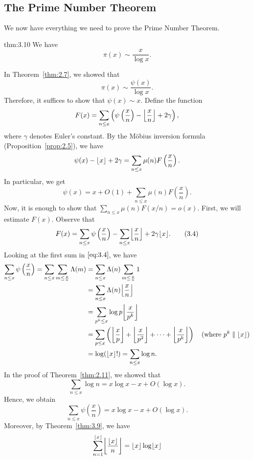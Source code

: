 \subsection{The Prime Number Theorem}\label{subsec:3.5}
We now have everything we need to prove the Prime Number Theorem. 

\begin{theo}{thm:3.10}
    We have 
    \[ \pi(x) \sim \frac{x}{\log x}. \] 
\end{theo}
\begin{pf}
    In Theorem~\ref{thm:2.7}, we showed that 
    \[ \pi(x) \sim \frac{\psi(x)}{\log x}. \] 
    Therefore, it suffices to show that $\psi(x) \sim x$. Define the function 
    \[ F(x) = \sum_{n\leq x} \left( \psi\left( \frac xn \right) - \floor*{\frac xn}
    + 2\gamma \right), \] 
    where $\gamma$ denotes Euler's constant. By the M\"obius inversion formula 
    (Proposition~\ref{prop:2.5}), we have 
    \[ \psi(x) - \floor{x} + 2\gamma = \sum_{n\leq x} \mu(n) F\left( \frac xn \right). \] 
    In particular, we get 
    \[ \psi(x) = x + O(1) + \sum_{n \leq x} \mu(n) F\left( \frac xn \right). \] 
    Now, it is enough to show that $\sum_{n\leq x} \mu(n) F(x/n) = o(x)$. First, 
    we will estimate $F(x)$. Observe that 
    \[ F(x) = \sum_{n\leq x} \psi\left( \frac xn \right) - \sum_{n \leq x} 
    \floor*{\frac xn} + 2\gamma\floor{x}. \tag{3.4}\label{eq:3.4} \]
    Looking at the first sum in $\eqref{eq:3.4}$, we have 
    \begin{align*}
        \sum_{n\leq x} \psi\left( \frac xn \right) 
        = \sum_{n \leq x} \sum_{m \leq \frac xn} \Lambda(m) 
        &= \sum_{n \leq x} \Lambda(n) \sum_{m\leq \frac xn} 1 \\
        &= \sum_{n \leq x} \Lambda(n) \floor*{\frac xn} \\
        &= \sum_{p^k \leq x} \log p \floor*{\frac x{p^k}} \\ 
        &= \sum_{p \leq x} \left( \floor*{\frac xp} + \floor*{\frac x{p^2}} 
        + \cdots + \floor*{\frac x{p^k}} \right) \quad \text{(where $p^k\;\|\;\floor{x}$)} \\
        &= \log(\floor{x}!) = \sum_{n \leq x} \log n. 
    \end{align*}
    In the proof of Theorem~\ref{thm:2.11}, we showed that 
    \[ \sum_{n\leq x} \log n = x\log x - x + O(\log x). \] 
    Hence, we obtain 
    \[ \sum_{n\leq x} \psi\left( \frac xn \right) = x\log x - x + O(\log x). \tag{3.5}\label{eq:3.5} \] 
    Moreover, by Theorem~\ref{thm:3.9}, we have 
    \[ \sum_{n=1}^{\floor{x}} \floor*{\frac{\floor x}n} = \floor{x}\log\floor{x} 
\]
\end{pf}
